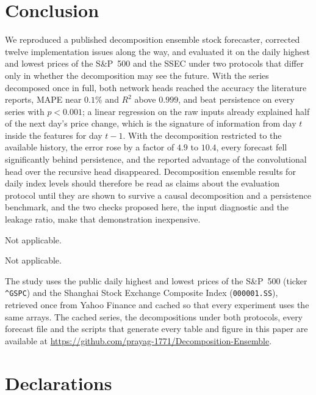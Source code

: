 \documentclass[pdflatex,sn-mathphys-num]{sn-jnl}%
\theoremstyle{thmstyleone}%
\theoremstyle{thmstyletwo}%
\theoremstyle{thmstylethree}%
\begin{document}
\section{Conclusion}\label{sec:conclusion}
We reproduced a published decomposition ensemble stock forecaster, corrected
twelve implementation issues along the way, and evaluated it on the daily
highest and lowest prices of the S\&P~500 and the SSEC under two protocols that
differ only in whether the decomposition may see the future. With the series
decomposed once in full, both network heads reached the accuracy the
literature reports, MAPE near $0.1\%$ and $R^2$ above $0.999$, and beat
persistence on every series with $p<0.001$; a linear regression on the raw
inputs already explained half of the next day's price change, which is the
signature of information from day $t$ inside the features for day $t-1$. With
the decomposition restricted to the available history, the error rose by a
factor of $4.9$ to $10.4$, every forecast fell significantly behind
persistence, and the reported advantage of the convolutional head over the
recursive head disappeared. Decomposition ensemble results for daily index
levels should therefore be read as claims about the evaluation protocol until
they are shown to survive a causal decomposition and a persistence benchmark,
and the two checks proposed here, the input diagnostic and the leakage ratio,
make that demonstration inexpensive.

\backmatter



 Not applicable.

 Not applicable.

 The study uses the public daily highest and lowest prices of
the S\&P~500 (ticker \texttt{\textasciicircum GSPC}) and the Shanghai Stock Exchange
Composite Index (\texttt{000001.SS}), retrieved once from Yahoo Finance and cached so
that every experiment uses the same arrays. The cached series, the decompositions under
both protocols, every forecast file and the scripts that generate every table and figure
in this paper are available at
\url{https://github.com/prayag-1771/Decomposition-Ensemble}.

\section*{Declarations}
\end{document}

